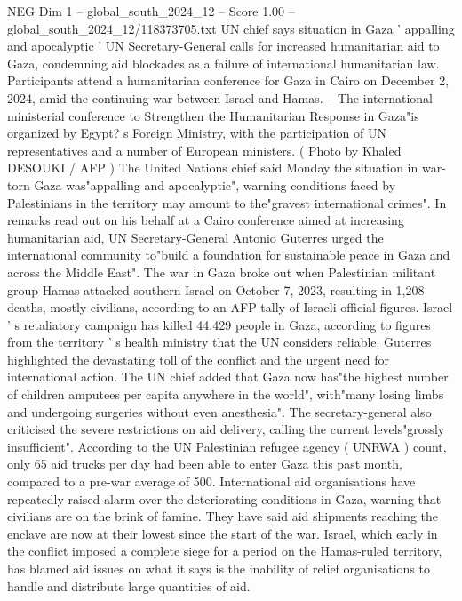 \begin{textsample}{NEG Dim 1 – global\_south\_2024\_12 – Score 1.00 – global\_south\_2024\_12/118373705.txt}  \label{ex:f1_neg_263}
UN chief says situation in Gaza ' appalling and apocalyptic ' UN Secretary-General calls for increased humanitarian aid to Gaza, condemning aid blockades as a failure of international humanitarian law.
Participants attend a humanitarian conference for Gaza in Cairo on December 2, 2024, amid the continuing war between Israel and Hamas. -- The international ministerial conference to Strengthen the Humanitarian Response in Gaza"is organized by Egypt? s Foreign Ministry, with the participation of UN representatives and a number of European ministers. ( Photo by Khaled DESOUKI / AFP ) The United Nations chief said Monday the situation in war-torn Gaza was"appalling and apocalyptic", warning conditions faced by Palestinians in the territory may amount to the"gravest international crimes".
In remarks read out on his behalf at a Cairo conference aimed at increasing humanitarian aid, UN Secretary-General Antonio Guterres urged the international community to"build a foundation for sustainable peace in Gaza and across the Middle East".
The war in Gaza broke out when Palestinian militant group Hamas attacked southern Israel on October 7, 2023, resulting in 1,208 deaths, mostly civilians, according to an AFP tally of Israeli official figures.
Israel ' s retaliatory campaign has killed 44,429 people in Gaza, according to figures from the territory ' s health ministry that the UN considers reliable.
Guterres highlighted the devastating toll of the conflict and the urgent need for international action.
The UN chief added that Gaza now has"the highest number of children amputees per capita anywhere in the world", with"many losing limbs and undergoing surgeries without even anesthesia".
The secretary-general also criticised the severe restrictions on aid delivery, calling the current levels"grossly insufficient".
According to the UN Palestinian refugee agency ( UNRWA ) count, only 65 aid trucks per day had been able to enter Gaza this past month, compared to a pre-war average of 500.
International aid organisations have repeatedly raised alarm over the deteriorating conditions in Gaza, warning that civilians are on the brink of famine.
They have said aid shipments reaching the enclave are now at their lowest since the start of the war.
Israel, which early in the conflict imposed a complete siege for a period on the Hamas-ruled territory, has blamed aid issues on what it says is the inability of relief organisations to handle and distribute large quantities of aid.

\end{textsample}
